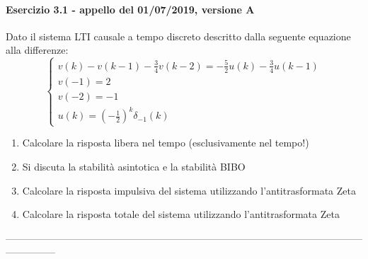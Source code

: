\documentclass[12pt,a4paper]{article}
\begin{document}
	\paragraph*{Esercizio 3.1 - appello del 01/07/2019, versione A}
	Dato il sistema LTI causale a tempo discreto descritto dalla seguente equazione alla differenze:
	\[
		\begin{cases}
		v(k) - v(k-1) -\frac{3}{4}v(k-2) = -\frac{5}{2}u(k) - \frac{3}{4}u(k-1)\\
		v(-1) = 2\\
		v(-2) = -1\\
		u(k) = \left(-\frac{1}{2}\right)^k\delta_{-1}(k)
		\end{cases}
	\]
	\begin{enumerate}
	\item Calcolare la risposta libera nel tempo (esclusivamente nel tempo!)
	\item Si discuta la stabilit\`a asintotica e la stabilit\`a BIBO
	\item Calcolare la risposta impulsiva del sistema utilizzando l'antitrasformata Zeta
	\item Calcolare la risposta totale del sistema utilizzando l'antitrasformata Zeta
	\end{enumerate}
	---------------------------------------------------------------------------------------------------------------------------\\
\end{document}
